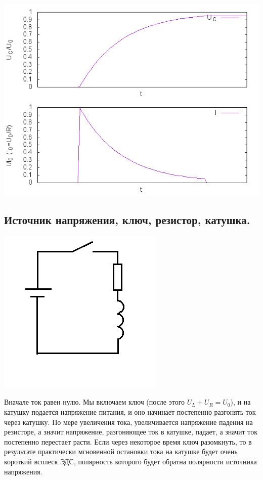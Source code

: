 \documentclass[11pt]{article} %
\begin{document}
\includegraphics{../plots/RC.png}

\subsection{Источник напряжения, ключ, резистор, катушка.}

\includegraphics{../RL.png}

Вначале ток равен нулю. Мы включаем ключ (после этого $U_L+U_R=U_0$), и на катушку подается напряжение питания, и оно начинает постепенно разгонять ток через катушку. По мере увеличения тока, увеличивается напряжение падения на резисторе, а значит напряжение, разгоняющее ток в катушке, падает, а значит ток постепенно перестает расти. Если через некоторое время ключ разомкнуть, то в результате практически мгновенной остановки тока на катушке будет очень короткий всплеск ЭДС, полярность которого будет обратна полярности источника напряжения.
\end{document}
